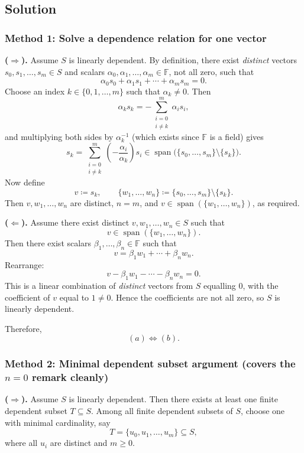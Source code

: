 \documentclass[12pt]{article}
\newcommand{\F}{\mathbb{F}}
\newcommand{\Span}{\operatorname{span}}
\begin{document}
\subsection{Solution}

\subsubsection{Method 1: Solve a dependence relation for one vector}
\textbf{(\(\Rightarrow\)).}
Assume \(S\) is linearly dependent.
By definition, there exist \emph{distinct} vectors \(s_0,s_1,\ldots,s_m\in S\) and scalars \(\alpha_0,\alpha_1,\ldots,\alpha_m\in\F\), not all zero, such that
\[
\alpha_0 s_0+\alpha_1 s_1+\cdots+\alpha_m s_m=0.
\]
Choose an index \(k\in\{0,1,\ldots,m\}\) such that \(\alpha_k\neq 0\).
Then
\[
\alpha_k s_k = -\sum_{\substack{i=0\\ i\neq k}}^{m} \alpha_i s_i,
\]
and multiplying both sides by \(\alpha_k^{-1}\) (which exists since \(\F\) is a field) gives
\[
s_k = \sum_{\substack{i=0\\ i\neq k}}^{m} \left(-\frac{\alpha_i}{\alpha_k}\right)s_i \in \Span\bigl(\{s_0,\ldots,s_m\}\setminus\{s_k\}\bigr).
\]
Now define
\[
v \coloneqq s_k,\qquad \{w_1,\ldots,w_n\}\coloneqq \{s_0,\ldots,s_m\}\setminus\{s_k\}.
\]
Then \(v,w_1,\ldots,w_n\) are distinct, \(n=m\), and \(v\in\Span(\{w_1,\ldots,w_n\})\), as required.

\textbf{(\(\Leftarrow\)).}
Assume there exist distinct \(v,w_1,\ldots,w_n\in S\) such that
\[
v\in \Span(\{w_1,\ldots,w_n\}).
\]
Then there exist scalars \(\beta_1,\ldots,\beta_n\in\F\) such that
\[
v=\beta_1 w_1+\cdots+\beta_n w_n.
\]
Rearrange:
\[
v-\beta_1 w_1-\cdots-\beta_n w_n=0.
\]
This is a linear combination of \emph{distinct} vectors from \(S\) equalling \(0\), with the coefficient of \(v\) equal to \(1\neq 0\).
Hence the coefficients are not all zero, so \(S\) is linearly dependent.

Therefore,
\[
\boxed{\ (a)\Longleftrightarrow (b).\ }
\]

\subsubsection{Method 2: Minimal dependent subset argument (covers the \(n=0\) remark cleanly)}
\textbf{(\(\Rightarrow\)).}
Assume \(S\) is linearly dependent.
Then there exists at least one finite dependent subset \(T\subseteq S\).
Among all finite dependent subsets of \(S\), choose one with minimal cardinality, say
\[
T=\{u_0,u_1,\ldots,u_m\}\subseteq S,
\]
where all \(u_i\) are distinct and \(m\ge 0\).
\end{document}

